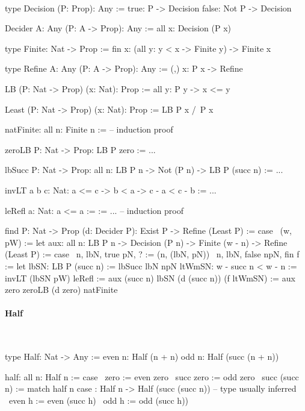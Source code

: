\ \begin{alba}
    type Decision (P: Prop): Any :=
        true:  P     -> Decision
        false: Not P -> Decision

    Decider {A: Any} (P: A -> Prop): Any :=
        all x: Decision (P x)

    type Finite: Nat -> Prop :=
        fin {x}: (all y: y < x -> Finite y) -> Finite x

    type Refine {A: Any} (P: A -> Prop): Any :=
        (,) x: P x -> Refine

    LB (P: Nat -> Prop) (x: Nat): Prop :=
        all {y}: P y -> x <= y

    Least (P: Nat -> Prop) (x: Nat): Prop :=
        LB P x /\ P x

    natFinite: all {n}: Finite n :=
        -- induction proof

    zeroLB {P: Nat -> Prop}: LB P zero := ...

    lbSucc {P: Nat -> Prop}:
        all {n}: LB P n -> Not (P n) -> LB P (succ n)
    := ...

    invLT {a b c: Nat}: a <= c -> b < a -> c - a < c - b
    := ...

    leRefl {a: Nat}: a <= a :=
    := ... -- induction proof

    find {P: Nat -> Prop} (d: Decider P): Exist P -> Refine (Least P)
    := case
        \ (w, pW) :=
            let
                aux: all n: LB P n -> Decision (P n) -> Finite (w - n)
                     -> Refine (Least P)
                := case
                    \ n, lbN, true pN, ? :=
                        (n, (lbN, pN))
                    \ n, lbN, false npN, fin f :=
                        let
                            lbSN: LB P (succ n) :=
                                lbSucc lbN npN
                            ltWmSN: w - succ n < w - n :=
                                invLT (lbSN pW) leRefl
                        :=
                            aux (succ n) lbSN (d (succ n)) (f ltWmSN)
            :=
                aux zero zeroLB (d zero) natFinite
\end{alba}





\paragraph{Half}

\ \begin{alba}
    type Half: Nat -> Any :=
        even n: Half (n + n)
        odd  n: Half (succ (n + n))

    half: all n: Half n := case
        \ zero          :=   even zero
        \ succ zero     :=   odd zero
        \ succ (succ n) :=
            match half n case
                : Half n -> Half (succ (succ n)) -- type usually inferred
                \ even h := even (succ h)
                \ odd  h := odd  (succ h))
\end{alba}

